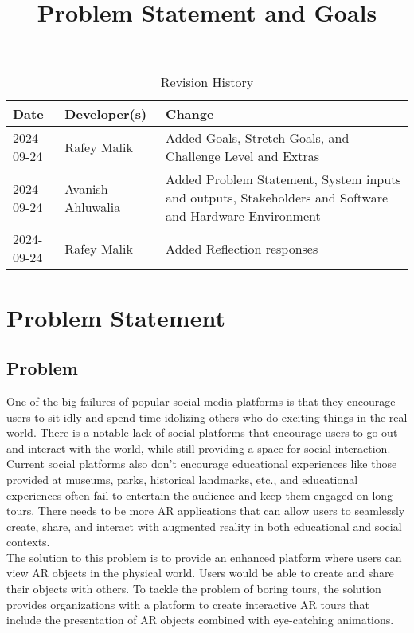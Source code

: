 \documentclass{article}
\title{Problem Statement and Goals\\\progname}
\author{\authname}
\date{}
\begin{document}
\maketitle

\begin{table}[hp]
\caption{Revision History} \label{TblRevisionHistory}
\begin{tabularx}{\textwidth}{llX}
\toprule
\textbf{Date} & \textbf{Developer(s)} & \textbf{Change}\\
\midrule
2024-09-24 & Rafey Malik & Added Goals, Stretch Goals, and Challenge Level and Extras\\
2024-09-24 & Avanish Ahluwalia & Added Problem Statement, System inputs and outputs, Stakeholders and Software and Hardware Environment\\
2024-09-24 & Rafey Malik & Added Reflection responses\\
\bottomrule
\end{tabularx}
\end{table}

\section{Problem Statement}

\subsection{Problem}
One of the big failures of popular social media platforms is that they encourage users to sit idly and spend time idolizing others who do exciting things in the real world. There is a notable lack of social platforms that encourage users to go out and interact with the world, while still providing a space for social interaction. Current social platforms also don’t encourage educational experiences like those provided at museums, parks, historical landmarks, etc., and educational experiences often fail to entertain the audience and keep them engaged on long tours. There needs to be more AR applications that can allow users to seamlessly create, share, and interact with augmented reality in both educational and social contexts.\\
The solution to this problem is to provide an enhanced platform where users can view AR objects in the physical world. Users would be able to create and share their objects with others. To tackle the problem of boring tours, the solution provides organizations with a platform to create interactive AR tours that include the presentation of AR objects combined with eye-catching animations.
\end{document}
